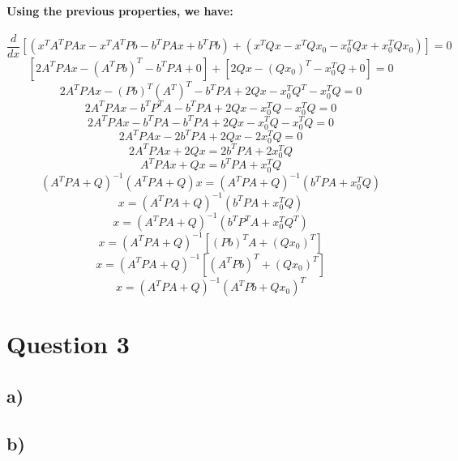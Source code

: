 \documentclass[a4paper]{article}    %
\begin{document}
\paragraph{Using the previous properties, we have:}
    \[\frac{d}{dx} [(x^TA^TPAx - x^TA^TPb -b^TPAx + b^TPb) + (x^TQx - x^TQx_0 - x_0^TQx + x_0^TQx_0)] = 0\]
    \[[2A^TPAx - (A^TPb)^T - b^TPA + 0] + [2Qx - (Qx_0)^T - x_0^TQ + 0] = 0\]
    \[2A^TPAx - (Pb)^T(A^T)^T - b^TPA + 2Qx - x_0^TQ^T - x_0^TQ = 0\]
    \[2A^TPAx - b^TP^TA - b^TPA + 2Qx - x_0^TQ - x_0^TQ = 0\]
    \[2A^TPAx - b^TPA - b^TPA + 2Qx - x_0^TQ - x_0^TQ = 0\]
    \[2A^TPAx - 2b^TPA + 2Qx - 2x_0^TQ = 0\]
    \[2A^TPAx + 2Qx = 2b^TPA + 2x_0^TQ\]
    \[A^TPAx + Qx = b^TPA + x_0^TQ\]
    \[(A^TPA + Q)^{-1}(A^TPA + Q)x = (A^TPA + Q)^{-1}(b^TPA + x_0^TQ)\]
    \[x = (A^TPA + Q)^{-1}(b^TPA + x_0^TQ)\]
    \[x = (A^TPA + Q)^{-1}(b^TP^TA + x_0^TQ^T)\]
    \[x = (A^TPA + Q)^{-1}[(Pb)^TA + (Qx_0)^T]\]
    \[x = (A^TPA + Q)^{-1}[(A^TPb)^T + (Qx_0)^T]\]
    \[\boxed{x = (A^TPA + Q)^{-1}(A^TPb + Qx_0)^T}\]
\newpage

\section*{Question 3}

\subsection*{a)}

\subsection*{b)}
\end{document}
